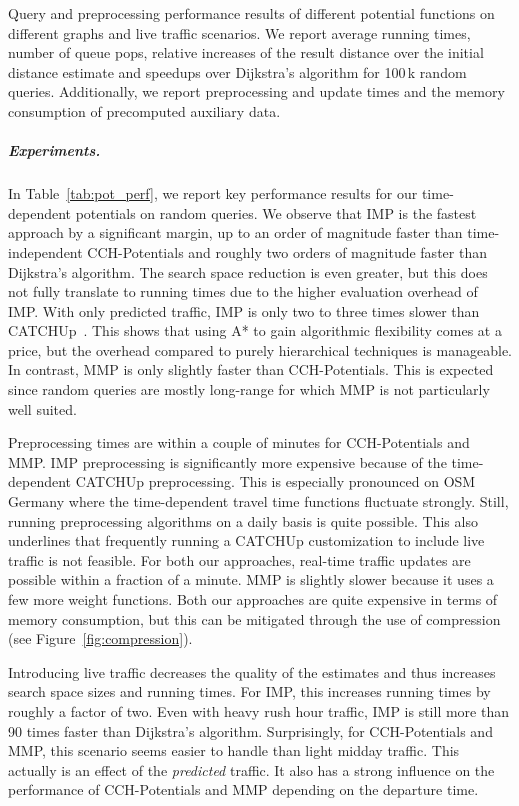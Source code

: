 \documentclass[a4paper,UKenglish,cleveref, autoref, thm-restate]{lipics-v2021}
\begin{document}
\begin{table}
\centering
\caption{
Query and preprocessing performance results of different potential functions on different graphs and live traffic scenarios.
We report average running times, number of queue pops, relative increases of the result distance over the initial distance estimate and speedups over Dijkstra's algorithm for 100\,k random queries.
Additionally, we report preprocessing and update times and the memory consumption of precomputed auxiliary data.
}\label{tab:pot_perf}

\end{table}

\subparagraph{Experiments.}
In Table~\ref{tab:pot_perf}, we report key performance results for our time-dependent potentials on random queries.
We observe that IMP is the fastest approach by a significant margin, up to an order of magnitude faster than time-independent CCH-Potentials and roughly two orders of magnitude faster than Dijkstra's algorithm.
The search space reduction is even greater, but this does not fully translate to running times due to the higher evaluation overhead of IMP.
With only predicted traffic, IMP is only two to three times slower than CATCHUp~\cite{swz-sfert-21}.
This shows that using A* to gain algorithmic flexibility comes at a price, but the overhead compared to purely hierarchical techniques is manageable.
In contrast, MMP is only slightly faster than CCH-Potentials.
This is expected since random queries are mostly long-range for which MMP is not particularly well suited.

Preprocessing times are within a couple of minutes for CCH-Potentials and MMP.
IMP preprocessing is significantly more expensive because of the time-dependent CATCHUp preprocessing.
This is especially pronounced on OSM Germany where the time-dependent travel time functions fluctuate strongly.
Still, running preprocessing algorithms on a daily basis is quite possible.
This also underlines that frequently running a CATCHUp customization to include live traffic is not feasible.
For both our approaches, real-time traffic updates are possible within a fraction of a minute.
MMP is slightly slower because it uses a few more weight functions.
Both our approaches are quite expensive in terms of memory consumption, but this can be mitigated through the use of compression (see Figure~\ref{fig:compression}).

Introducing live traffic decreases the quality of the estimates and thus increases search space sizes and running times.
For IMP, this increases running times by roughly a factor of two.
Even with heavy rush hour traffic, IMP is still more than 90 times faster than Dijkstra's algorithm.
Surprisingly, for CCH-Potentials and MMP, this scenario seems easier to handle than light midday traffic.
This actually is an effect of the \emph{predicted} traffic.
It also has a strong influence on the performance of CCH-Potentials and MMP depending on the departure time.
\end{document}
